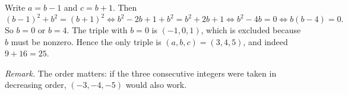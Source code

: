 Write $a=b-1$ and $c=b+1$. Then
\[(b-1)^2+b^2=(b+1)^2\iff b^2-2b+1+b^2=b^2+2b+1\iff b^2-4b=0\iff b(b-4)=0 .\]
So $b=0$ or $b=4$. The triple with $b=0$ is $(-1,0,1)$, which is excluded because $b$ must be nonzero. Hence the only triple is $\boxed{(a,b,c)=(3,4,5)}$, and indeed $9+16=25$.

\emph{Remark.} The order matters: if the three consecutive integers were taken in decreasing order, $(-3,-4,-5)$ would also work.
